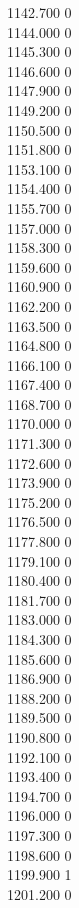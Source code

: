 { 1142.700	0 \\
 1144.000	0 \\
 1145.300	0 \\
 1146.600	0 \\
 1147.900	0 \\
 1149.200	0 \\
 1150.500	0 \\
 1151.800	0 \\
 1153.100	0 \\
 1154.400	0 \\
 1155.700	0 \\
 1157.000	0 \\
 1158.300	0 \\
 1159.600	0 \\
 1160.900	0 \\
 1162.200	0 \\
 1163.500	0 \\
 1164.800	0 \\
 1166.100	0 \\
 1167.400	0 \\
 1168.700	0 \\
 1170.000	0 \\
 1171.300	0 \\
 1172.600	0 \\
 1173.900	0 \\
 1175.200	0 \\
 1176.500	0 \\
 1177.800	0 \\
 1179.100	0 \\
 1180.400	0 \\
 1181.700	0 \\
 1183.000	0 \\
 1184.300	0 \\
 1185.600	0 \\
 1186.900	0 \\
 1188.200	0 \\
 1189.500	0 \\
 1190.800	0 \\
 1192.100	0 \\
 1193.400	0 \\
 1194.700	0 \\
 1196.000	0 \\
 1197.300	0 \\
 1198.600	0 \\
 1199.900	1 \\
 1201.200	0 \\
}
